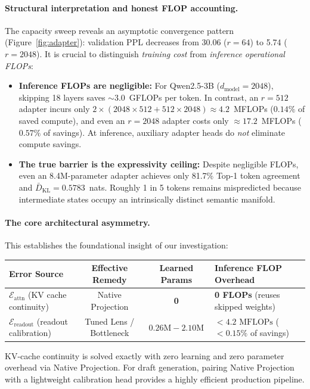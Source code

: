 \documentclass{article}
\newcommand{\kl}{\bar{D}_{\mathrm{KL}}}
\newcommand{\Eattn}{\mathcal{E}_{\text{attn}}}
\newcommand{\Ereadout}{\mathcal{E}_{\text{readout}}}
\begin{document}
\paragraph{Structural interpretation and honest FLOP accounting.}
The capacity sweep reveals an asymptotic convergence pattern (Figure~\ref{fig:adapter}): validation PPL decreases from 30.06 ($r{=}64$) to 5.74 ($r{=}2048$). It is crucial to distinguish \emph{training cost} from \emph{inference operational FLOPs}:
\begin{itemize}[nosep,leftmargin=*]
    \item \textbf{Inference FLOPs are negligible:} For Qwen2.5-3B ($d_{\text{model}}=2048$), skipping 18 layers saves $\sim$3.0~GFLOPs per token. In contrast, an $r{=}512$ adapter incurs only $2 \times (2048 \times 512 + 512 \times 2048) \approx 4.2$~MFLOPs ($0.14\%$ of saved compute), and even an $r{=}2048$ adapter costs only $\approx 17.2$~MFLOPs ($0.57\%$ of savings). At inference, auxiliary adapter heads do \emph{not} eliminate compute savings.
    \item \textbf{The true barrier is the expressivity ceiling:} Despite negligible FLOPs, even an 8.4M-parameter adapter achieves only 81.7\% Top-1 token agreement and $\kl = 0.5783$~nats. Roughly 1 in 5 tokens remains mispredicted because intermediate states occupy an intrinsically distinct semantic manifold.
\end{itemize}

\paragraph{The core architectural asymmetry.}
This establishes the foundational insight of our investigation:

\begin{center}
\begin{tabular}{@{}lccl@{}}
\toprule
\textbf{Error Source} & \textbf{Effective Remedy} & \textbf{Learned Params} & \textbf{Inference FLOP Overhead} \\
\midrule
$\Eattn$ (KV cache continuity) & Native Projection & \textbf{0} & \textbf{0 FLOPs} (reuses skipped weights) \\
$\Ereadout$ (readout calibration) & Tuned Lens / Bottleneck & $0.26\text{M} - 2.10\text{M}$ & $< 4.2\text{ MFLOPs}$ ($< 0.15\%$ of savings) \\
\bottomrule
\end{tabular}
\end{center}

KV-cache continuity is solved exactly with zero learning and zero parameter overhead via Native Projection. For draft generation, pairing Native Projection with a lightweight calibration head provides a highly efficient production pipeline.
\end{document}
